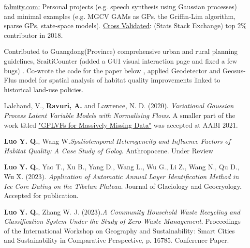 

\begin{cvskills}

  {\href{https://www.falmity.com}{falmity.com:} Personal projects (e.g. speech synthesis using Gaussian processes) and minimal examples (e.g. MGCV GAMs as GPs, the Griffin-Lim algorithm, sparse GPs, state-space models). \href{https://stats.stackexchange.com/users/211930/infprobscix}{Cross Validated}: (Stats Stack Exchange) top 2\% contributor in 2018.}

  {Contributed to Guangdong(Province) comprehensive urban and rural planning guidelines, SraitiCounter (added a GUI visual interaction page and fixed a few bugs) . Co-wrote the code for the paper below , applied Geodetector and Geosus-Flus model for spatial analysis of habitat quality improvements linked to historical land-use policies.}

  {\item Lalchand, V., \textbf{Ravuri, A.} and Lawrence, N. D. (2020). \textit{Variational Gaussian Process Latent Variable Models with Normalising Flows}. A smaller part of the work titled \href{https://openreview.net/pdf?id=zaMwvOjsyym}{"GPLVFs for Massively Missing Data"} was accepted at AABI 2021.}
  

{
  \item \textbf{Luo Y. Q.}, Wang W.\textit{Spatiotemporal Heterogeneity and Influence Factors of Habitat Quality: A Case Study of Golog}. Anthropocene. Under Review
  \item \textbf{Luo Y. Q.}, Yao T., Xu B., Yang D., Wang L., Wu G., Li Z., Wang N., Qu D., Wu X. (2023). \textit{Application of Automatic Annual Layer Identification Method in Ice Core Dating on the Tibetan Plateau}. Journal of Glaciology and Geocryology. Accepted for publication.
  \item \textbf{Luo Y. Q.}, Zhang W. J. (2023).\textit{A Community Household Waste Recycling and Classification System Under the Study of Zero-Waste Management}. Proceedings of the International Workshop on Geography and Sustainability: Smart Cities and Sustainability in Comparative Perspective, p. 16785. Conference Paper.
 
   }



\end{cvskills}




